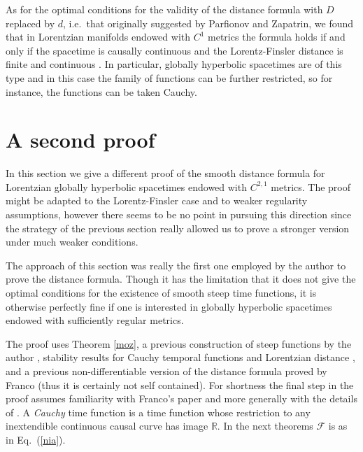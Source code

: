 \documentclass[a4paper]{jpconf}
\theoremstyle{definition}
\theoremstyle{remark}
\begin{document}
As for the optimal conditions for the validity of the distance formula with $D$ replaced by $d$, i.e.\ that originally suggested by Parfionov and Zapatrin, we found that in Lorentzian manifolds endowed with $C^1$ metrics the formula holds if and only if the spacetime is causally continuous and the Lorentz-Finsler  distance is finite and continuous \cite{minguzzi17}. In particular, globally hyperbolic spacetimes are of this type and in this case the family of functions can be further restricted, so for instance, the functions can be taken Cauchy.







\section{A second proof}

In this section we give a different proof of  the smooth distance formula for Lorentzian globally hyperbolic spacetimes endowed with $C^{2,1}$ metrics. The proof might be adapted to the Lorentz-Finsler case and to  weaker regularity assumptions, however there seems to be no point in pursuing this direction since the strategy of the previous section really allowed us to prove a stronger version  under much weaker conditions.

The approach of this section was really the first one employed by the author to prove the distance formula. Though it has the limitation that it does not give the optimal conditions for the existence of smooth steep time functions,  it  is otherwise perfectly fine if one is interested in globally hyperbolic spacetimes endowed with sufficiently regular metrics.

The proof uses Theorem \ref{moz}, a previous construction of steep functions by the author  \cite{minguzzi16a},  stability results for Cauchy temporal functions  and Lorentzian distance \cite{minguzzi17}, and a previous non-differentiable version of the distance formula proved by Franco \cite{franco10} (thus it is certainly not self contained). For shortness the final step in the proof assumes familiarity with Franco's paper and more generally with
the details of \cite{minguzzi16a,franco10}.  A {\em Cauchy} time function is a time function whose restriction to any inextendible continuous causal curve has image  $\mathbb{R}$. In the next theorems $\mathscr{F}$ is as in Eq.\ (\ref{nia}).
\end{document}
